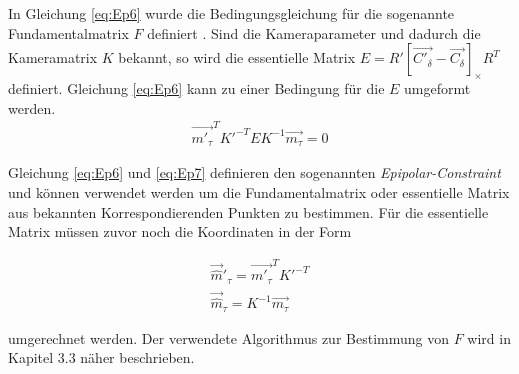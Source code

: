 In Gleichung \ref{eq:Ep6} wurde die Bedingungsgleichung für die sogenannte Fundamentalmatrix $F$ definiert \cite{Hoffmann}. Sind die Kameraparameter und dadurch die Kameramatrix $K$ bekannt, so wird die essentielle Matrix $E=R' \left[ \vec{C'_\delta}-\vec{C_\delta}\right]_\times R^T$ definiert. Gleichung \ref{eq:Ep6} kann zu einer Bedingung für die $E$ umgeformt werden.
\begin{gather}
	\vec{m'_\tau}^TK'^{-T}EK^{-1}\vec{m_\tau} = 0\label{eq:Ep7}
\end{gather}

Gleichung \ref{eq:Ep6} und \ref{eq:Ep7} definieren den sogenannten \textit{Epipolar-Constraint}\cite{HZ,Hoffmann} und können verwendet werden um die Fundamentalmatrix oder essentielle Matrix aus bekannten Korrespondierenden Punkten zu bestimmen. Für die essentielle Matrix müssen zuvor noch die Koordinaten in der Form

\begin{gather}
	\vec{\hat{m}}'_\tau = \vec{m'_\tau}^TK'^{-T}\\
	\vec{\hat{m}}_\tau = K^{-1}\vec{m_\tau}\label{eq:equ8}
\end{gather}

umgerechnet werden\cite{HZ,phdextrinsicPara}.  Der verwendete Algorithmus zur Bestimmung von $F$ wird in Kapitel 3.3 näher beschrieben.\\











